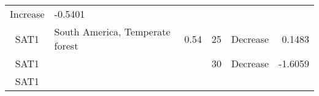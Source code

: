 \documentclass[]{article}
\begin{document}
\begin{longtable}[]{@{}clrccr@{}}
\begin{minipage}[t]{0.16\columnwidth}
Increase\strut
\end{minipage} & \begin{minipage}[t]{0.09\columnwidth}\raggedleft\strut
-0.5401\strut
\end{minipage}\tabularnewline
\begin{minipage}[t]{0.08\columnwidth}\centering\strut
SAT1\strut
\end{minipage} & \begin{minipage}[t]{0.29\columnwidth}\raggedright\strut
South America, Temperate forest\strut
\end{minipage} & \begin{minipage}[t]{0.11\columnwidth}\raggedleft\strut
0.54\strut
\end{minipage} & \begin{minipage}[t]{0.10\columnwidth}\centering\strut
25\strut
\end{minipage} & \begin{minipage}[t]{0.16\columnwidth}\centering\strut
Decrease\strut
\end{minipage} & \begin{minipage}[t]{0.09\columnwidth}\raggedleft\strut
0.1483\strut
\end{minipage}\tabularnewline
\begin{minipage}[t]{0.08\columnwidth}\centering\strut
SAT1\strut
\end{minipage} & \begin{minipage}[t]{0.29\columnwidth}\raggedright\strut
\strut
\end{minipage} & \begin{minipage}[t]{0.11\columnwidth}\raggedleft\strut
\strut
\end{minipage} & \begin{minipage}[t]{0.10\columnwidth}\centering\strut
30\strut
\end{minipage} & \begin{minipage}[t]{0.16\columnwidth}\centering\strut
Decrease\strut
\end{minipage} & \begin{minipage}[t]{0.09\columnwidth}\raggedleft\strut
-1.6059\strut
\end{minipage}\tabularnewline
\begin{minipage}[t]{0.08\columnwidth}\centering\strut
SAT1\strut
\end{minipage} & \begin{minipage}[t]{0.29\columnwidth}\raggedright\strut
\strut
\end{minipage} & \begin{minipage}[t]{0.11\columnwidth}\raggedleft\strut

\end{minipage}
\end{longtable}
\end{document}
